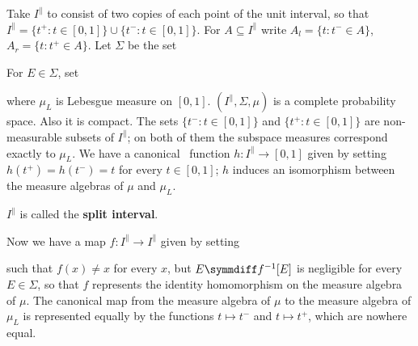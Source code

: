   Take $I^{\|}$ to consist of two
copies of each point of the unit interval, so that
$I^{\|}=\{t^+:t\in[0,1]\}\cup\{t^-:t\in[0,1]\}$.   For
$A\subseteq I^{\|}$ write
$A_l=\{t:t^-\in A\}$, $A_r=\{t:t^+\in A\}$.   Let $\Sigma$ be the set


\noindent For $E\in\Sigma$, set


\noindent where $\mu_L$ is Lebesgue measure on $[0,1]$.
 $(I^{\|},\Sigma,\mu)$ is a complete
probability space.
Also it is compact.   
The sets $\{t^-:t\in[0,1]\}$
and $\{t^+:t\in[0,1]\}$ are non-measurable subsets of $I^{\|}$;  on both
of them
the subspace measures correspond exactly to $\mu_L$.   We have a
canonical \imp\ function $h:I^{\|}\to[0,1]$ given by
setting $h(t^+)=h(t^-)=t$ for every $t\in[0,1]$;  $h$ induces an
isomorphism between the measure algebras of $\mu$ and $\mu_L$.

$I^{\|}$ is called the {\bf split interval}.

Now  we have
a map $f:I^{\|}\to I^{\|}$ given by setting


\noindent such that $f(x)\ne x$ for every $x$, but
$E\symmdiff f^{-1}[E]$ is negligible for every $E\in\Sigma$, so that $f$
represents the identity homomorphism on the measure algebra of $\mu$.
The canonical map from the measure algebra of $\mu$ to
the measure
algebra of $\mu_L$ is represented equally by the functions 
$t\mapsto t^-$ and $t\mapsto t^+$, which are nowhere equal.

